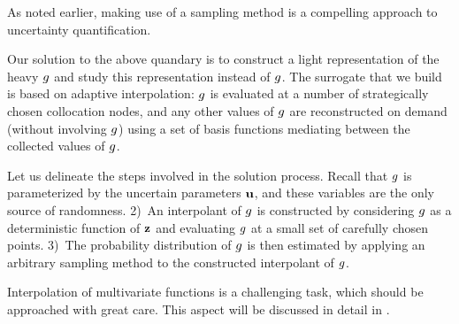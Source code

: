 As noted earlier, making use of a sampling method is a compelling approach to
uncertainty quantification. 

Our solution to the above quandary is to construct a light representation of the
heavy $g$ and study this representation instead of $g$. The surrogate that we
build is based on adaptive interpolation: $g$ is evaluated at a number of
strategically chosen collocation nodes, and any other values of $g$ are
reconstructed on demand (without involving $g$) using a set of basis functions
mediating between the collected values of $g$. 

Let us delineate the steps involved in the solution process. Recall that $g$ is
parameterized by the uncertain parameters $\mathbf{u}$, and these variables are the
only source of randomness.  2)~An interpolant of $g$ is constructed
by considering $g$ as a deterministic function of $\mathbf{z}$ and evaluating $g$ at
a small set of carefully chosen points. 3)~The probability distribution of $g$
is then estimated by applying an arbitrary sampling method to the constructed
interpolant of $g$.

Interpolation of multivariate functions is a challenging task, which should be
approached with great care. This aspect will be discussed in detail in
. 
